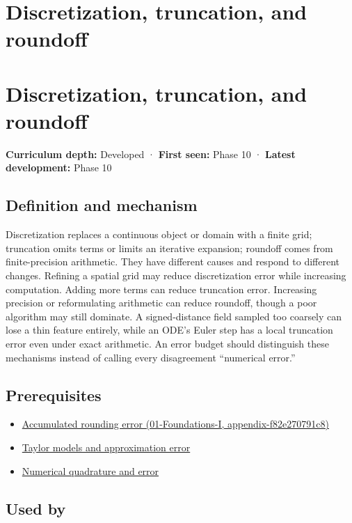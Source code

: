 \hypertarget{appendix-6b0648b2b8e8}{}
\section*{Discretization, truncation, and roundoff}
\section{Discretization, truncation, and roundoff}\label{discretization-truncation-and-roundoff}

\textbf{Curriculum depth:} Developed · \textbf{First seen:} Phase 10 · \textbf{Latest development:} Phase 10

\subsection{Definition and mechanism}\label{definition-and-mechanism}

Discretization replaces a continuous object or domain with a finite grid; truncation omits terms or limits an iterative expansion; roundoff comes from finite-precision arithmetic. They have different causes and respond to different changes. Refining a spatial grid may reduce discretization error while increasing computation. Adding more terms can reduce truncation error. Increasing precision or reformulating arithmetic can reduce roundoff, though a poor algorithm may still dominate. A signed-distance field sampled too coarsely can lose a thin feature entirely, while an ODE's Euler step has a local truncation error even under exact arithmetic. An error budget should distinguish these mechanisms instead of calling every disagreement ``numerical error.''

\subsection{Prerequisites}\label{prerequisites}

\begin{itemize}
\tightlist
\item
  \href{}{Accumulated rounding error (01-Foundations-I, appendix-f82e270791c8)}
\item
  \hyperref[appendix-32f39e9a3738]{Taylor models and approximation error}
\item
  \hyperref[appendix-80521eae6b71]{Numerical quadrature and error}
\end{itemize}

\subsection{Used by}\label{used-by}

